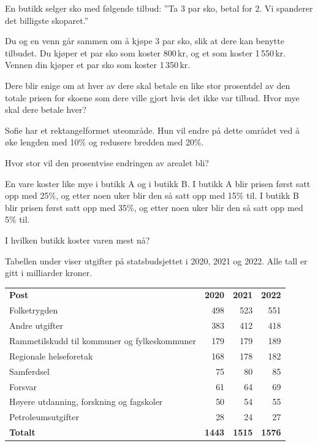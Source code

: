 En butikk selger sko med følgende tilbud: ''Ta 3 par sko, betal for 2. Vi spanderer det billigste skoparet.''\os

Du og en venn går sammen om å kjøpe 3 par sko, slik at dere kan benytte tilbudet. Du kjøper et par sko som koster 800\,kr, og et som koster 1\,550\,kr. Vennen din kjøper et par sko som koster 1\,350\,kr.\os

Dere blir enige om at hver av dere skal betale en like stor prosentdel av den totale prisen for skoene som dere ville gjort hvis det ikke var tilbud. Hvor mye skal dere betale hver?

Sofie har et rektangelformet uteområde. Hun vil endre på dette området ved å øke
lengden med 10\% og redusere bredden med 20\%. \os

Hvor stor vil den prosentvise endringen av arealet bli?



En vare koster like mye i butikk A og i butikk B.
I butikk A blir prisen først satt opp med 25\%, og etter noen uker
blir den så satt opp med 15\% til.
I butikk B blir prisen først satt opp med 35\%, og etter noen uker
blir den så satt opp med 5\% til. \os

I hvilken butikk koster varen mest nå?

\newpage
{}

Tabellen under viser
utgifter på statsbudsjettet
i 2020, 2021 og 2022.
Alle tall er gitt i milliarder kroner.
\begin{center}
	\begin{table}[htbp]
		\centering
		\small
		\begin{tabular}{lrrr}
			\textbf{Post} & \textbf{2020} & \textbf{2021} & \textbf{2022} \\
			Folketrygden                                  & 498 & 523 & 551 \\
			Andre utgifter                                & 383 & 412 & 418 \\
			Rammetilskudd til kommuner og fylkeskommuner  & 179 & 179 & 189 \\
			Regionale helseforetak                        & 168 & 178 & 182 \\
			Samferdsel                                    &  75 &  80 &  85 \\
			Forsvar                                       &  61 &  64 &  69 \\
			Høyere utdanning, forskning og fagskoler      &  50 &  54 &  55 \\
			Petroleumsutgifter                            &  28 &  24 &  27\\
			\textbf{Totalt}                               & \textbf{1443} & \textbf{1515} & \textbf{1576} \\
		\end{tabular}
	\end{table}
\end{center}

